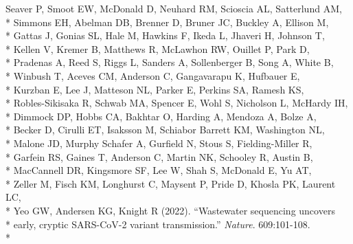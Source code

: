 \documentclass[margin,line]{res}
\begin{document}
\begin{resume}
\hspace*{9mm} Seaver P, Smoot EW, McDonald D, Neuhard RM, Scioscia AL, Satterlund AM,\\*
\hspace*{9mm} Simmons EH, Abelman DB, Brenner D, Bruner JC, Buckley A, Ellison M,\\*
\hspace*{9mm} Gattas J, Gonias SL, Hale M, Hawkins F, Ikeda L, Jhaveri H, Johnson T,\\*
\hspace*{9mm} Kellen V, Kremer B, Matthews R, McLawhon RW, Ouillet P, Park D,\\*
\hspace*{9mm} Pradenas A, Reed S, Riggs L, Sanders A, Sollenberger B, Song A, White B,\\*
\hspace*{9mm} Winbush T, Aceves CM, Anderson C, Gangavarapu K, Hufbauer E,\\*
\hspace*{9mm} Kurzban E, Lee J, Matteson NL, Parker E, Perkins SA, Ramesh KS,\\*
\hspace*{9mm} Robles-Sikisaka R, Schwab MA, Spencer E, Wohl S, Nicholson L, McHardy IH,\\*
\hspace*{9mm} Dimmock DP, Hobbs CA, Bakhtar O, Harding A, Mendoza A, Bolze A,\\*
\hspace*{9mm} Becker D, Cirulli ET, Isaksson M, Schiabor Barrett KM, Washington NL,\\*
\hspace*{9mm} Malone JD, Murphy Schafer A, Gurfield N, Stous S, Fielding-Miller R,\\*
\hspace*{9mm} Garfein RS, Gaines T, Anderson C, Martin NK, Schooley R, Austin B,\\*
\hspace*{9mm} MacCannell DR, Kingsmore SF, Lee W, Shah S, McDonald E, Yu AT,\\*
\hspace*{9mm} Zeller M, Fisch KM, Longhurst C, Maysent P, Pride D, Khosla PK, Laurent LC,\\*
\hspace*{9mm} Yeo GW, Andersen KG, Knight R (2022). ``Wastewater sequencing uncovers\\*
\hspace*{9mm} early, cryptic SARS-CoV-2 variant transmission.'' \textit{Nature}. 609:101-108.\\*\vspace{2mm}

\end{resume}
\end{document}
